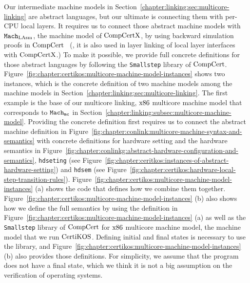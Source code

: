 Our intermediate machine models in Section~\ref{chapter:linking:sec:multicore-linking} are abstract languages, but our ultimate is connecting them with per-CPU local layers. 
It requires us to connect those abstract machine models with ${\mathrm{\texttt{Mach}}}_{\mathrm{LAsm}}$, the machine model of $\mathrm{CompCertX}$,
by using backward simulation proofs in $\mathrm{CompCert}$~\cite{leroy06} (\ie, it is also used in layer linking of local layer interfaces  with $\mathrm{CompCertX}$.)
To make it possible,
we provide  full concrete definitions for those abstract languages
by following the \lstinline$Smallstep$ library of $\mathrm{CompCert}$.
Figure~\ref{fig:chapter:certikos:multicore-machine-model-instances}
shows two instances, which is the concrete definition 
of two machine models among the machine models in Section~\ref{chapter:linking:sec:multicore-linking}.
The first example is the base of our multicore linking, $\mathrm{x86}$ multicore machine model that corresponds to ${{{{\mathrm{\texttt{Mach}}}}_{\mathrm{\texttt{mc}}}}}$ in Section~\ref{chapter:linking:subsec:multicore-machine-model}.
Providing the concrete definition first requires 
us to connect the abstract machine definition in Figure~\ref{fig:chapter:conlink:multicore-machine-syntax-and-semantics}
with concrete definitions for hardware setting and the hardware semantics in Figure~\ref{fig:chapter:conlinkg:abstract-hardware-configuration-and-semantics}, \lstinline$hdseting$ (see Figure~\ref{fig:chapter:ceritkos:instances-of-abstract-hardware-setting}) and \lstinline$hdsem$ (see Figure~\ref{fig:chapter:certikos:hardware-local-step-transition-rules}). 
Figure~\ref{fig:chapter:certikos:multicore-machine-model-instances} (a) shows 
the code that defines how we combine them together.
Figure~\ref{fig:chapter:certikos:multicore-machine-model-instances} (b) 
also shows how we define the full semantics by using the  definition in Figure~\ref{fig:chapter:certikos:multicore-machine-model-instances} (a) as well as the \lstinline$Smallstep$ library of $\mathrm{CompCert}$  for $\mathrm{x86}$ multicore machine model, the machine model that we run $\mathrm{CertiKOS}$. 
Defining initial and final states is necessary to use the library, and Figure~\ref{fig:chapter:certikos:multicore-machine-model-instances} (b)  also provides those definitions.
For simplicity, we assume that the program does not have a final state, which we think it is not a big assumption 
on the verification of operating systems.

